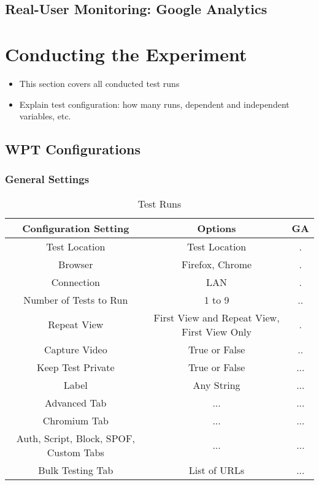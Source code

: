 



\subsection{Real-User Monitoring: Google Analytics}






\section{Conducting the Experiment}

\begin{itemize}
    \item This section covers all conducted test runs
    \item Explain test configuration: how many runs, dependent and independent variables, etc.
\end{itemize}






\subsection{WPT Configurations}


\subsubsection{General Settings}

\begin{table}[h]
	\caption[Test Runs]{Test Runs \cite{DBLP:books/infix/Schwarz99}}
	\label{tab:tamodelleVergleich}
	\centering
	\begin{tabular}{ c | c | c } 
	Configuration Setting & Options & GA \\
	\hline \hline
	Test Location & Test Location & . \\ 
	Browser & Firefox, Chrome & . \\
	\hline
	Connection & LAN & . \\
	Number of Tests to Run & 1 to 9 & .. \\
	Repeat View & First View and Repeat View, First View Only & . \\
	Capture Video & True or False & .. \\
	Keep Test Private & True or False & ... \\
	Label & Any String & ... \\
	\hline	  
	Advanced Tab & ... & ... \\
	Chromium Tab & ... & ... \\
	Auth, Script, Block, SPOF, Custom Tabs & ... & ... \\
	Bulk Testing Tab & List of URLs & ... \\
	\end{tabular}
\end{table}


